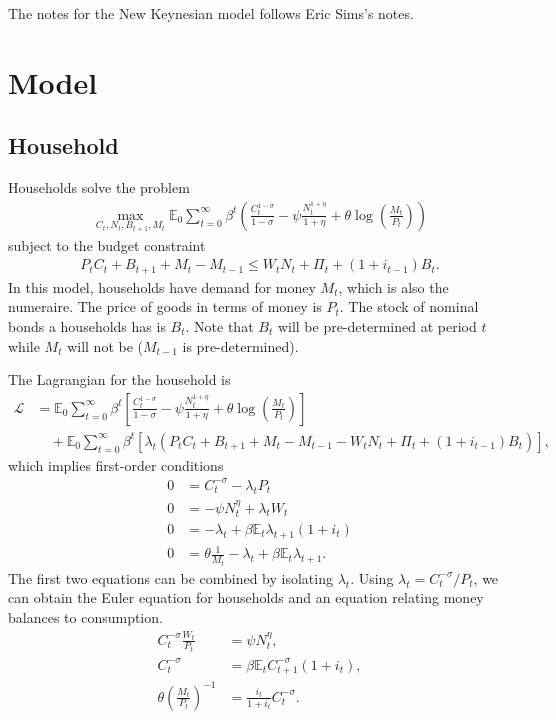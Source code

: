 \documentclass[12 pt, oneside]{article}
\theoremstyle{definition}
\theoremstyle{definition}
\theoremstyle{definition}
\newcommand{\E}{\mathbb{E}}
\newcommand{\calL}{\mathcal{L}}
\begin{document}
The notes for the New Keynesian model follows Eric Sims's notes.

\section{Model}


\subsection{Household}

Households solve the problem
\begin{align*}
  \max_{C_t, N_t, B_{t + 1}, M_t} \E_0 \sum_{t = 0}^\infty \beta^t \left( \frac{C_t^{1 - \sigma}}{1 - \sigma} - \psi \frac{N_t^{1 + \eta}}{1 + \eta} + \theta\log\left(\frac{M_t}{P_t}\right) \right)
\end{align*}
subject to the budget constraint
\begin{align*}
  P_tC_t + B_{t + 1} + M_t - M_{t - 1} \leq W_t N_t + \Pi_t + (1 + i_{t - 1})B_t.
\end{align*}
In this model, households have demand for money $M_t$, which is also the numeraire. The price of goods in terms of money is $P_t$.
The stock of nominal bonds a households has is $B_t$.
Note that $B_t$ will be pre-determined at period $t$ while $M_t$ will not be ($M_{t - 1}$ is pre-determined).

The Lagrangian for the household is
\begin{align*}
\calL & = \E_0 \sum_{t = 0}^\infty \beta^t\left[\frac{C_t^{1 - \sigma}}{1 - \sigma} - \psi \frac{N_t^{1 + \eta}}{1 + \eta} + \theta\log\left(\frac{M_t}{P_t}\right)\right]\\
        &\quad + \E_0 \sum_{t = 0}^\infty \beta^t\left[\lambda_t(  P_tC_t + B_{t + 1} + M_t - M_{t - 1} - W_t N_t + \Pi_t + (1 + i_{t - 1})B_t)\right],
\end{align*}
which implies first-order conditions
\begin{align*}
  0 & = C_t^{- \sigma} - \lambda_t P_t\\
  0 & = -\psi N_t^\eta + \lambda_t W_t\\
  0 & = -\lambda_t + \beta \E_t\lambda_{t + 1}(1 + i_t)\\
  0 & = \theta \frac{1}{M_t} - \lambda_t + \beta\E_t\lambda_{t + 1}.
\end{align*}
The first two equations can be combined by isolating $\lambda_t$.
Using $\lambda_t = C_t^{-\sigma} / P_t$, we can obtain the Euler equation for households
and an equation relating money balances to consumption.
\begin{align*}
  C_t^{-\sigma} \frac{W_t}{P_t} & = \psi N_t^\eta,\\
  C_t^{-\sigma} & = \beta\E_t C_{t + 1}^{-\sigma} ( 1 + i_t),\\
  \theta\left(\frac{M_t}{P_t}\right)^{-1} & = \frac{i_t}{1 + i_t}C_t^{-\sigma}.
\end{align*}
\end{document}
